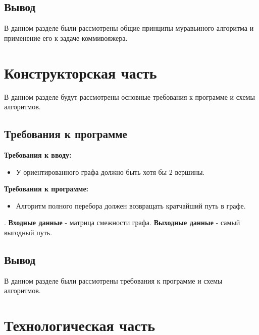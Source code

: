 \documentclass[12pt]{report}
\begin{document}
\section*{Вывод}
В данном разделе были рассмотрены общие принципы муравьиного алгоритма и применение его к задаче коммивояжера. 


\chapter{Конструкторская часть}
В данном разделе будут рассмотрены основные требования к программе и схемы алгоритмов.

\section{Требования к программе}
\textbf{Требования к вводу:}
\begin{itemize}
	\item У ориентированного графа должно быть хотя бы 2 вершины.
\end{itemize}

\textbf{Требования к программе:}
\begin{itemize}
	\item Алгоритм полного перебора должен возвращать кратчайший путь в графе.
\end{itemize}
.  
\newline  
\textbf{Входные данные} - матрица смежности графа.  
\newline
\textbf{Выходные данные} - самый выгодный путь.


\section*{Вывод}
В данном разделе были рассмотрены требования к программе и схемы алгоритмов.


\chapter{Технологическая часть}
\end{document}
